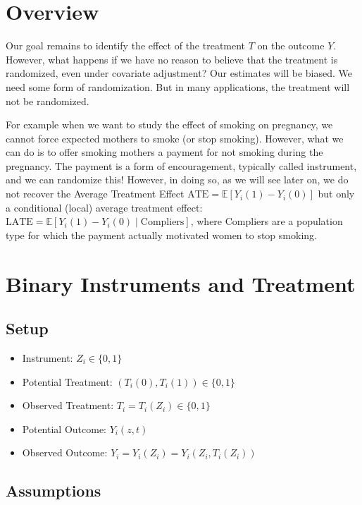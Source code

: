 \documentclass[11pt]{exam}
\theoremstyle{plain}
\newcommand{\E}{\mathbb{E}}
\newcommand{\ATE}{\mathrm{ATE}}
\newcommand{\LATE}{\mathrm{LATE}}
\begin{document}

\begingroup\small

\section{Overview}
Our goal remains to identify the effect of the treatment $T$ on the outcome $Y$. However, what happens if we have no reason to believe that the treatment is randomized, even under covariate adjustment? Our estimates will be biased. We need some form of randomization. But in many applications, the treatment will not be randomized.

For example when we want to study the effect of smoking on pregnancy, we cannot force expected mothers to smoke (or stop smoking). However, what we can do is to offer smoking mothers a payment for not smoking during the pregnancy. The payment is a form of encouragement, typically called instrument, and we can randomize this! However, in doing so, as we will see later on, we do not recover the Average Treatment Effect $\ATE = \E[Y_i(1) - Y_i(0)]$ but only a conditional (local) average treatment effect: $\LATE = \E[Y_i(1) - Y_i(0) \mid \text{Compliers}]$, where Compliers are a population type for which the payment actually motivated women to stop smoking. 

\section{Binary Instruments and Treatment}
\subsection{Setup}
\begin{itemize}
    \item Instrument: $Z_i \in \{0, 1\}$
    \item Potential Treatment: $(T_i(0), T_i(1)) \in \{0, 1\}$
    \item Observed Treatment: $T_i = T_i(Z_i) \in \{0, 1\}$
    \item Potential Outcome: $Y_i(z, t)$
    \item Observed Outcome: $Y_i = Y_i(Z_i) = Y_i(Z_i, T_i(Z_i))$
\end{itemize}


\subsection{Assumptions}\label{subsec:ass}
\end{document}
